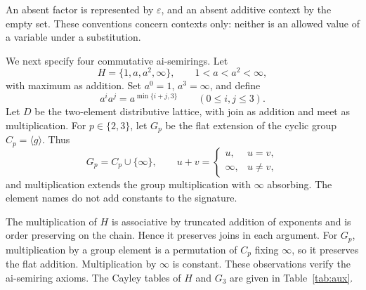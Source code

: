 \documentclass[11pt,reqno]{amsart}
\theoremstyle{remark}
\newcommand{\eps}{\varepsilon}
\numberwithin{equation}{section}
\begin{document}
An absent factor is represented by $\eps$, and an absent additive context
by the empty set. These conventions concern contexts only: neither is an
allowed value of a variable under a substitution.

We next specify four commutative ai-semirings. Let
\[
H=\{1,a,a^2,\infty\},\qquad 1<a<a^2<\infty,
\]
with maximum as addition. Set $a^0=1$, $a^3=\infty$, and define
\[
a^ia^j=a^{\min\{i+j,3\}}\qquad(0\leq i,j\leq3).
\]
Let $D$ be the two-element distributive lattice, with join as addition and
meet as multiplication. For $p\in\{2,3\}$, let $G_p$ be the flat extension
of the cyclic group $C_p=\langle g\rangle$. Thus
\[
G_p=C_p\cup\{\infty\},\qquad
u+v=\begin{cases}u,&u=v,\\ \infty,&u\ne v,\end{cases}
\]
and multiplication extends the group multiplication with $\infty$
absorbing. The element names do not add constants to the signature.

The multiplication of $H$ is associative by truncated addition of
exponents and is order preserving on the chain. Hence it preserves joins
in each argument. For $G_p$, multiplication by a group element is a
permutation of $C_p$ fixing $\infty$, so it preserves the flat addition.
Multiplication by $\infty$ is constant. These observations verify the
ai-semiring axioms. The Cayley tables of $H$ and $G_3$ are given in
Table~\ref{tab:aux}.
\end{document}
